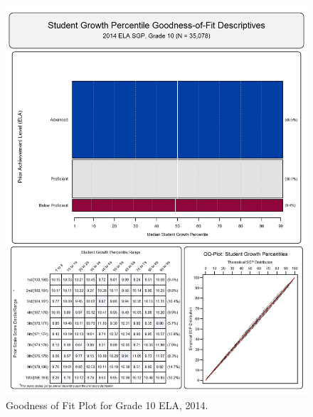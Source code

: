 \documentclass[12pt]{article}
\begin{document}
\begin{figure}[htbp]
\centering
\includegraphics{../img/Goodness_of_Fit/ELA.2014/2014_ELA_10;2013_ELA_9;2012_ELA_8;2011_ELA_7;2010_ELA_6;2009_ELA_5;2008_ELA_4.png}
\caption{Goodness of Fit Plot for Grade 10 ELA, 2014.}
\end{figure}
\end{document}
